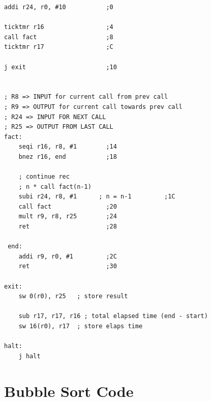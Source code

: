 \begin{lstlisting}[style=mips,caption={Factorial DLX Assembly example},label=asm_factorial]
addi r24, r0, #10           ;0

ticktmr r16                 ;4
call fact                   ;8
ticktmr r17                 ;C

j exit                      ;10


; R8 => INPUT for current call from prev call
; R9 => OUTPUT for current call towards prev call
; R24 => INPUT FOR NEXT CALL
; R25 => OUTPUT FROM LAST CALL
fact:
    seqi r16, r8, #1        ;14
    bnez r16, end           ;18

    ; continue rec
    ; n * call fact(n-1)
    subi r24, r8, #1      ; n = n-1         ;1C
    call fact               ;20 
    mult r9, r8, r25        ;24
    ret                     ;28
 
 end:
    addi r9, r0, #1         ;2C
    ret                     ;30

exit:
    sw 0(r0), r25   ; store result
    
    sub r17, r17, r16 ; total elapsed time (end - start)
    sw 16(r0), r17  ; store elaps time

halt:
    j halt

\end{lstlisting}


\newpage
\section{Bubble Sort Code}

